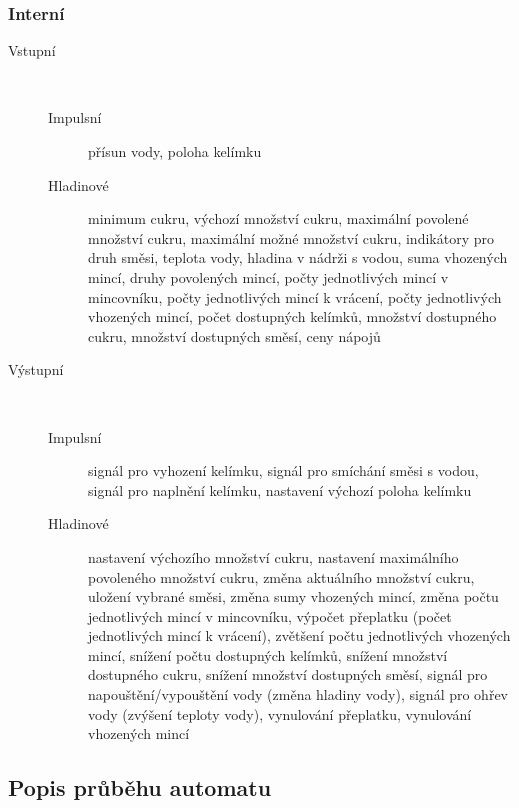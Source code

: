\documentclass[12pt,a4paper]{article}
\begin{document}
\subsubsection{Interní}
\begin{description}

\item [Vstupní] ~ 

\begin{description}

\item [Impulsní] přísun vody, poloha kelímku

\item [Hladinové] minimum cukru, výchozí množství cukru, maximální povolené množství cukru, maximální možné množství cukru, indikátory pro druh směsi, teplota vody, hladina v nádrži s vodou, suma vhozených mincí, druhy povolených mincí, počty jednotlivých mincí v mincovníku, počty jednotlivých mincí k vrácení, počty jednotlivých vhozených mincí, počet dostupných kelímků, množství dostupného cukru, množství dostupných směsí, ceny nápojů

\end{description}
\newpage
\item [Výstupní] ~

\begin{description}

\item [Impulsní] signál pro vyhození kelímku, signál pro smíchání směsi s vodou, signál pro naplnění kelímku, nastavení výchozí poloha kelímku

\item [Hladinové] nastavení výchozího množství cukru, nastavení maximálního povoleného množství cukru, změna aktuálního množství cukru, uložení vybrané směsi, změna sumy vhozených mincí, změna počtu jednotlivých mincí v mincovníku, výpočet přeplatku (počet jednotlivých mincí k vrácení), zvětšení počtu jednotlivých vhozených mincí, snížení počtu dostupných kelímků, snížení množství dostupného cukru, snížení množství dostupných směsí, signál pro napouštění/vypouštění vody (změna hladiny vody), signál pro ohřev vody (zvýšení teploty vody), vynulování přeplatku, vynulování vhozených mincí

\end{description}

\end{description} 

\subsection{Popis průběhu automatu}
\end{document}
